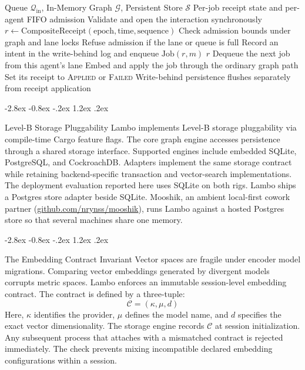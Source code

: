 \documentclass[10pt,twocolumn]{article}
\makeatletter
\renewcommand\subsection{\@startsection{subsection}{2}{\z@}%
  {-2.8ex \@plus -0.8ex \@minus -.2ex}%
  {1.2ex \@plus .2ex}%
  {\normalfont\normalsize\bfseries\raggedright}}
\makeatother
\begin{document}
\begin{algorithm}[t]
\caption{Asynchronous Ingestion and Receipt Scheduling}
\label{alg:ingest}
\small
\begin{algorithmic}[1]
\Require Queue $\mathcal{Q}_{\text{in}}$, In-Memory Graph $\mathcal{G}$, Persistent Store $\mathcal{S}$
\Ensure Per-job receipt state and per-agent FIFO admission
    \State Validate and open the interaction synchronously
    \State $r \gets \text{CompositeReceipt}(\text{epoch}, \text{time}, \text{sequence})$
    \State Check admission bounds under graph and lane locks
    \State Refuse admission if the lane or queue is full
    \State Record an intent in the write-behind log and enqueue $\text{Job}(r,m)$
    \State \Return $r$
\EndFunction
\Statex
{}
        \State Dequeue the next job from this agent's lane
        \State Embed and apply the job through the ordinary graph path
        \State Set its receipt to \textsc{Applied} or \textsc{Failed}
        \State Write-behind persistence flushes separately from receipt application
    \EndWhile
\EndFunction
\end{algorithmic}
\end{algorithm}

\subsection{Level-B Storage Pluggability}
Lambo implements Level-B storage pluggability via compile-time Cargo feature flags.
The core graph engine accesses persistence through a shared storage interface.
Supported engines include embedded SQLite, PostgreSQL, and CockroachDB.
Adapters implement the same storage contract while retaining backend-specific transaction and vector-search implementations.
The deployment evaluation reported here uses SQLite on both rigs.
Lambo ships a Postgres store adapter beside SQLite.
Mooshik, an ambient local-first cowork partner (\href{https://github.com/nrynss/mooshik}{github.com/nrynss/mooshik}), runs Lambo against a hosted Postgres store so that several machines share one memory.

\subsection{The Embedding Contract Invariant}
Vector spaces are fragile under encoder model migrations.
Comparing vector embeddings generated by divergent models corrupts metric spaces.
Lambo enforces an immutable session-level embedding contract.
The contract is defined by a three-tuple:
\begin{equation}
\mathcal{C} = (\kappa, \mu, d)
\end{equation}
Here, $\kappa$ identifies the provider, $\mu$ defines the model name, and $d$ specifies the exact vector dimensionality.
The storage engine records $\mathcal{C}$ at session initialization.
Any subsequent process that attaches with a mismatched contract is rejected immediately.
The check prevents mixing incompatible declared embedding configurations within a session.
\end{document}
